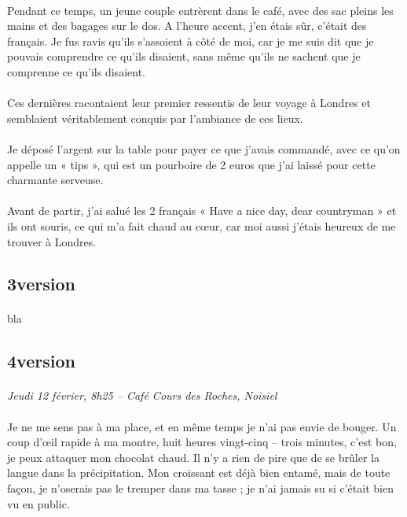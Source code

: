\paragraph{}
Pendant ce temps, un jeune couple entrèrent dans le café, avec des sac pleins les mains et des bagages sur le dos. A l’heure accent, j’en étais sûr, c’était des français. Je fus ravis qu’ils s’assoient à côté de moi, car je me suis dit que je pouvais comprendre ce qu’ils disaient, sans même qu’ils ne sachent que je comprenne ce qu’ils disaient.

\paragraph{}
Ces dernières racontaient leur premier ressentis de leur voyage à Londres et semblaient véritablement conquis par l’ambiance de ces lieux.

\paragraph{}
Je déposé l’argent sur la table pour payer ce que j’avais commandé, avec ce qu’on appelle un « tips », qui est un pourboire de 2 euros que j’ai laissé pour cette charmante serveuse. 

\paragraph{}
Avant de partir, j’ai salué les 2 français « Have a nice day, dear countryman » et ils ont souris, ce qui m’a fait chaud au cœur, car moi aussi j’étais heureux de me trouver à Londres.


\subsection{3\ieme version}
\paragraph{}
bla

\subsection{4\ieme version}
\paragraph{}
\emph{Jeudi 12 février, 8h25 – Café Cours des Roches, Noisiel}

\paragraph{}
Je ne me sens pas à ma place, et en même temps je n’ai pas envie de bouger. Un coup d’œil rapide à ma montre, huit heures vingt-cinq – trois minutes, c’est bon, je peux attaquer mon chocolat chaud. Il n’y a rien de pire que de se brûler la langue dans la précipitation. Mon croissant est déjà bien entamé, mais de toute façon, je n’oserais pas le tremper dans ma tasse ; je n’ai jamais su si c’était bien vu en public.

